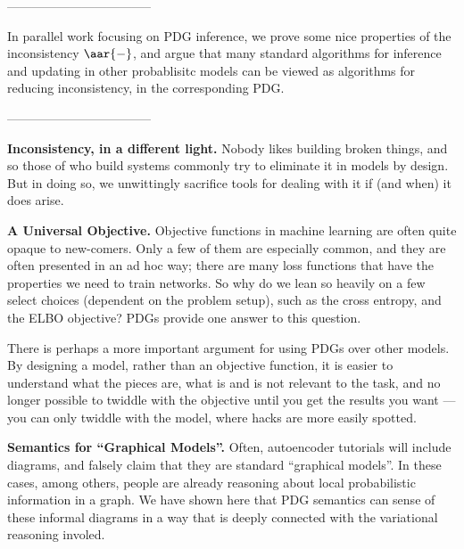 -----------------------------------


In parallel work focusing on PDG inference,
	we prove some nice properties of the inconsistency $\aar{-}$,
	and argue that many standard algorithms for inference and updating in other probablisitc models can be viewed as algorithms for reducing inconsistency, in the corresponding PDG.



-----------------------------------

\textbf{Inconsistency, in a different light.}
Nobody likes building broken things, and so those of who build systems commonly try to eliminate it in models by design. But in doing so, we unwittingly sacrifice tools for dealing with it if (and when) it does arise.


\textbf{A Universal Objective.}
Objective functions in machine learning are often quite opaque to new-comers.
Only a few of them are especially common, and they are often presented in an ad hoc way; there are many loss functions that have the properties we need to train networks. So why do we lean so heavily on a few select choices (dependent on the problem setup), such as the cross entropy, and the ELBO objective?
PDGs provide one answer to this question.

There is perhaps a more important argument for using PDGs over other models. By designing a model, rather than an objective function, it is easier to understand what the pieces are, what is and is not relevant to the task, and no longer possible to twiddle with the objective until you get the results you want --- you can only twiddle with the model, where hacks are more easily spotted.

\textbf{Semantics for ``Graphical Models''.}
Often, autoencoder tutorials will include diagrams, and falsely claim that they are standard ``graphical models''. In these cases, among others, people are already reasoning about local probabilistic information in a graph. We have shown here that PDG semantics can sense of these informal diagrams in a way that is deeply connected with the variational reasoning involed.
